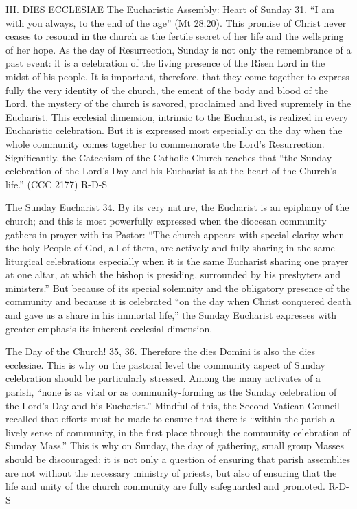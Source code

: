 \documentclass[oneside]{book}
\begin{document}
III. DIES ECCLESIAE
The Eucharistic Assembly: Heart of Sunday
31. ``I am with you always, to the end of the age'' (Mt 28:20). This promise of
Christ never ceases to resound in the church as the fertile secret of her life
and the wellspring of her hope. As the day of Resurrection, Sunday is not only
the remembrance of a past event: it is a celebration of the living presence of
the Risen Lord in the midst of his people. It is important, therefore, that they
come together to express fully the very identity of the church, the ement of the
body and blood of the Lord, the mystery of the church is savored, proclaimed and
lived supremely in the Eucharist. This ecclesial dimension, intrinsic to the
Eucharist, is realized in every Eucharistic celebration. But it is expressed
most especially on the day when the whole community comes together to
commemorate the Lord's Resurrection. Significantly, the Catechism of the
Catholic Church teaches that ``the Sunday celebration of the Lord's Day and his
Eucharist is at the heart of the Church's life.'' (CCC 2177)
R-D-S

The Sunday Eucharist
34. By its very nature, the Eucharist is an epiphany of the church; and this is
most powerfully expressed when the diocesan community gathers in prayer with its
Pastor: ``The church appears with special clarity when the holy People of God,
all of them, are actively and fully sharing in the same liturgical celebrations
especially when it is the same Eucharist  sharing one prayer at one altar, at
which the bishop is presiding, surrounded by his presbyters and ministers.'' But
because of its special solemnity and the obligatory presence of the community
and because it is celebrated ``on the day when Christ conquered death and gave
us a share in his immortal life,'' the Sunday Eucharist expresses with greater
emphasis its inherent ecclesial dimension.

The Day of the Church!
35, 36. Therefore the dies Domini is also the dies ecclesiae. This is why on the
pastoral level the community aspect of Sunday celebration should be particularly
stressed. Among the many activates of a parish, ``none is as vital or as
community-forming as the Sunday celebration of the Lord's Day and his
Eucharist.'' Mindful of this, the Second Vatican Council recalled that efforts
must be made to ensure that there is ``within the parish a lively sense of
community, in the first place through the community celebration of Sunday
Mass.'' This is why on Sunday, the day of gathering, small group Masses should
be discouraged: it is not only a question of ensuring that parish assemblies are
not without the necessary ministry of priests, but also of ensuring that the
life and unity of the church community are fully safeguarded and promoted.
R-D-S
\end{document}
